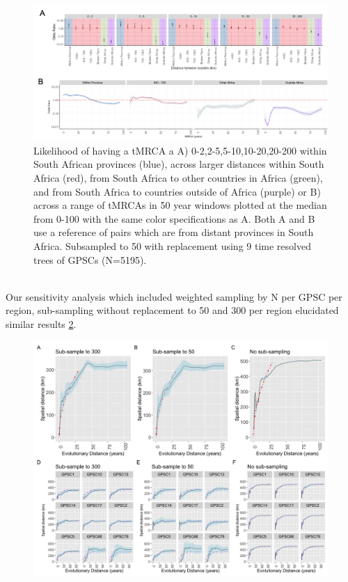 \documentclass{article}
\begin{document}
\begin{figure}[H]
\centering
    \includegraphics[width=\textwidth]{timeanddistance.png}
    \caption{Likelihood of having a tMRCA a A) 0-2,2-5,5-10,10-20,20-200 within South African provinces (blue), across larger distances within South Africa (red), from South Africa to other countries in Africa (green), and from South Africa to countries outside of Africa (purple) or B) across a range of tMRCAs in 50 year windows plotted at the median from 0-100 with the same color specifications as A. Both A and B use a reference of pairs which are from distant provinces in South Africa. Subsampled to 50 with replacement using 9 time resolved trees of GPSCs (N=5195).}
      \label{fig:timedistance}
\end{figure}
\\Our sensitivity analysis which included weighted sampling by N per GPSC per region, sub-sampling without replacement to 50 and 300 per region elucidated similar results \ref{fig:sensanalysis}. 
\begin{figure}[H]
\centering
    \includegraphics[width=\textwidth]{sensitivity_sampling.jpeg}
    \caption{}
      \label{fig:sensanalysis}
\end{figure}
\end{document}
